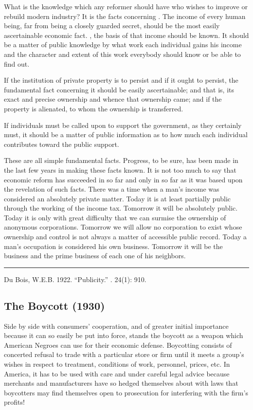 \documentclass[letterpaper,10pt,english]{jupyterBook}
\begin{document}
\sphinxAtStartPar
What is the  knowledge which any reformer should have who wishes to improve or rebuild modern industry? It is the facts concerning . The income of every human being, far from being a closely guarded secret, should be the most easily ascertainable economic fact. , the basis of that income should be known. It should be a matter of public knowledge by what work each individual gains his income and the character and extent of this work everybody should know or be able to find out.

\sphinxAtStartPar
If the institution of private property is to persist and if it ought to persist, the fundamental fact concerning it should be easily ascertainable; and that is, its exact and precise ownership and whence that ownership came; and if the property is alienated, to whom the ownership is transferred.

\sphinxAtStartPar
If individuals must be called upon to support the government, as they certainly must, it should be a matter of public information as to how much each individual contributes toward the public support.

\sphinxAtStartPar
These are all simple fundamental facts. Progress, to be sure, has been made in the last few years in making these facts known. It is not too much to say that economic reform has succeeded in so far and only in so far as it was based upon the revelation of such facts. There was a time when a man’s income was considered an absolutely private matter. Today it is at least partially public through the working of the income tax. Tomorrow it will be absolutely public. Today it is only with great difficulty that we can surmise the ownership of anonymous corporations. Tomorrow we will allow no corporation to exist whose ownership and control is not always a matter of accessible public record. Today a man’s occupation is considered his own business. Tomorrow it will be the business and the prime business of each one of his neighbors.


\bigskip\hrule\bigskip


\sphinxAtStartPar
{} Du Bois, W.E.B. 1922. “Publicity.” . 24(1): 9\sphinxhyphen{}10.


\subsection{The Boycott (1930)}
\label{\detokenize{Volumes/37/03/boycott:the-boycott-1930}}\label{\detokenize{Volumes/37/03/boycott::doc}}
\sphinxAtStartPar
Side by side with consumers’ cooperation, and of greater initial importance because it can so easily be put into force, stands the boycott as a weapon which American Negroes can use for their economic defense. Boycotting consists of concerted refusal to trade with a particular store or firm until it meets a group’s wishes in respect to treatment, conditions of work, personnel, prices, etc. In America, it has to be used with care and under careful legal advice because merchants and manufacturers have so hedged themselves about with laws that boycotters may find themselves open to prosecution for interfering with the firm’s profits!
\end{document}
